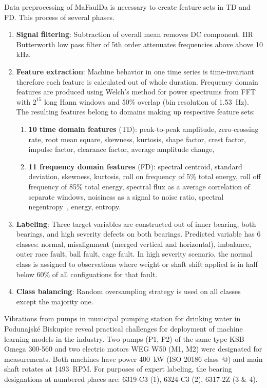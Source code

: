 \documentclass{llncs}
\makeatletter
\newcommand*{\rom}[1]{\expandafter\@slowromancap\romannumeral #1@}
\makeatother
\begin{document}
Data preprocessing of MaFaulDa is necessary to create feature sets in TD and FD. This process of several phases.
\begin{enumerate}
\item \textbf{Signal filtering}: Subtraction of overall mean removes DC component. IIR Butterworth low pass filter of 5th order attenuates frequencies above above 10 kHz.
\item \textbf{Feature extraction}: Machine behavior in one time series is time-invariant therefore each feature is calculated out of whole duration. Frequency domain features are produced using Welch's method for power spectrums from FFT with $2^{15}$ long Hann windows and 50\% overlap  (bin resolution of 1.53~Hz). The resulting features belong to domains making up respective feature sets:
\begin{enumerate}
\item \textbf{10 time domain features} (TD): peak-to-peak amplitude, zero-crossing rate, root mean square, skewness, kurtosis, shape factor, crest factor, impulse factor, clearance factor, average amplitude change,
\item \textbf{11 frequency domain features} (FD): spectral centroid, standard deviation, skewness, kurtosis, roll on frequency of 5\% total energy, roll off frequency of 85\% total energy, spectral flux as a average correlation of separate windows, noisiness as a signal to noise ratio, spectral negentropy~\cite{avoci_spectral_2020}, energy, entropy.
\end{enumerate}
\item \textbf{Labeling}: Three target variables are constructed out of inner bearing, both bearings, and high severity defects on both bearings. Predicted variable has 6 classes: normal, misalignment (merged vertical and horizontal), imbalance, outer race fault, ball fault, cage fault. In high severity scenario, the normal class is assigned to observations where weight or shaft shift applied is in half below 60\% of all configuations for that fault.
\item \textbf{Class balancing}: Random oversampling strategy is used on all classes except the majority one.
\end{enumerate}

Vibrations from pumps in municipal pumping station for drinking water in Podunajské Biskupice reveal practical challenges for deployment of machine learning models in the industry. Two pumps (P1, P2) of the same type KSB Omega 300-560 and two electric motors WEG W50 (M1, M2) were designated for measurements. Both machines have power 400~kW (ISO 20186 class~\rom{3}) and main shaft rotates at 1493~RPM. For purposes of expert labeling, the bearing designations at numbered places are: 6319-C3 (1), 6324-C3 (2), 6317-2Z (3 \& 4). 
\end{document}
